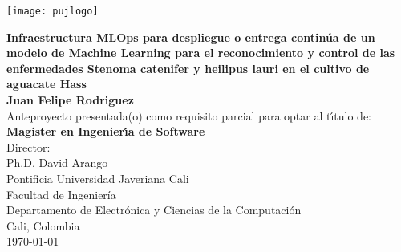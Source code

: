 \begin{center}
\thispagestyle{empty}
\vspace*{0cm}
\begin{center}
    \texttt{[image: pujlogo]}~\\[1.75cm]
\end{center}
\textbf{\fontsize{11}{12}\selectfont
Infraestructura MLOps para despliegue o entrega continúa de un modelo de Machine Learning para el reconocimiento y control de las enfermedades Stenoma catenifer y heilipus lauri en el cultivo de aguacate Hass}\\[1.75cm]
\normalsize\textbf{Juan Felipe Rodriguez}\\[1.5cm]
\small Anteproyecto presentada(o) como requisito parcial para optar al
t\'{\i}tulo de:\\
\textbf{Magister en Ingenier\'{\i}a de Software}\\[1.5cm]
Director:\\
Ph.D. David Arango\\[1.6cm]

Pontificia Universidad Javeriana Cali\\
Facultad de Ingeniería\\
Departamento de Electrónica y Ciencias de la Computación\\
Cali, Colombia\\
\today\\
\end{center}
